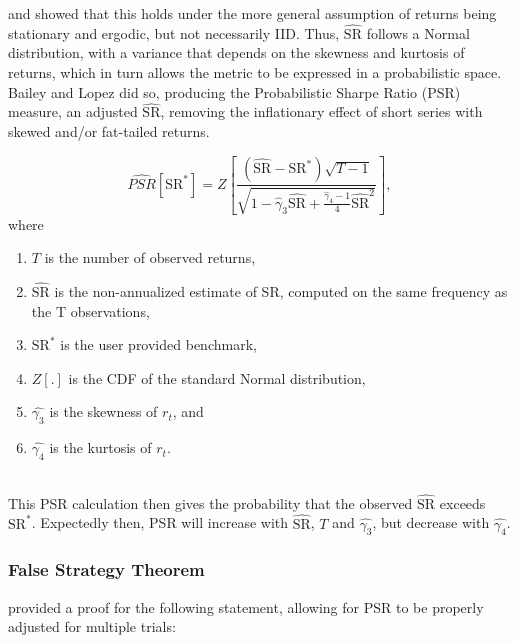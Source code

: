 \documentclass[a4paper,11pt,oneside]{article}
\theoremstyle{plain}
\theoremstyle{definition}
\begin{document}
	\citet{Christie} and \citet{Opdyke} showed that this holds under the more general assumption of returns being stationary and ergodic, but not necessarily IID. Thus, $\widehat{\mathrm{SR}}$ follows a Normal distribution, with a variance that depends on the skewness and kurtosis of returns, which in turn allows the metric to be expressed in a probabilistic space. Bailey and Lopez did so, producing the Probabilistic Sharpe Ratio (PSR) measure, an adjusted $\widehat{\mathrm{SR}}$, removing the inflationary effect of short series with skewed and/or fat-tailed returns. 
	
	\begin{equation}\label{eq_psr}
	\widehat{P S R}\left[\mathrm{SR}^{*}\right]=Z\left[\frac{\left(\widehat{\mathrm{SR}}-\mathrm{SR}^{*}\right) \sqrt{T-1}}{\sqrt{1-\hat{\gamma}_{3} \widehat{\mathrm{SR}}+\frac{\hat{\gamma}_{4}-1}{4} \widehat{\mathrm{SR}}^{2}}}\right], 
	\end{equation}
	where
	\begin{enumerate}
		\item $T$ is the number of observed returns,
		\item $\widehat{\mathrm{SR}}$ is the non-annualized estimate of SR, computed on the same frequency as the T observations,
		\item $\mathrm{SR}^*$ is the user provided benchmark,
		\item $Z[.]$ is the CDF of the standard Normal distribution,
		\item $\hat{\gamma_3}$ is the skewness of $r_t$, and
		\item $\hat{\gamma_4}$ is the kurtosis of $r_t$.
	\end{enumerate}
	~\\
	This PSR calculation then gives the probability that the observed $\widehat{\mathrm{SR}}$ exceeds $\mathrm{SR}^*$. Expectedly then, PSR will increase with $\widehat{\mathrm{SR}}$, $T$ and $\hat{\gamma_3}$, but decrease with $\hat{\gamma_4}$.
		
	\subsubsection{False Strategy Theorem}\label{imp_fst}
	
	\citet{BaileySharpe} provided a proof for the following statement, allowing for PSR to be properly adjusted for multiple trials:
	
\end{document}

